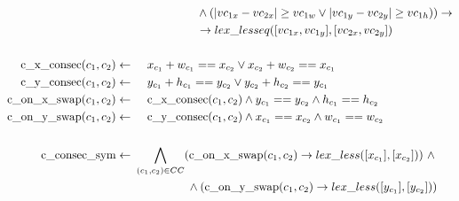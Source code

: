 \begin{align}
                                             & \hspace{2cm} \land (|vc_{1x} - vc_{2x}| \geq vc_{1w} \lor  |vc_{1y} - vc_{2y}| \geq vc_{1h}))  \rightarrow              \nonumber                                                                                           \\
                                             & \hspace{2cm} \rightarrow lex\_lesseq([vc_{1x}, vc_{1y}], [vc_{2x}, vc_{2y}])                                              \\
                                             & \nonumber                                                                                                                                                         \\
  \text{c\_x\_consec}(c_1, c_2)   \leftarrow & \hspace{0.5cm} x_{c_1} + w_{c_1} == x_{c_2} \lor x_{c_2} + w_{c_2} == x_{c_1}                                                                                     \\
  \text{c\_y\_consec}(c_1, c_2)   \leftarrow & \hspace{0.5cm} y_{c_1} + h_{c_1} == y_{c_2} \lor y_{c_2} + h_{c_2} == y_{c_1}                                                                                     \\
  \text{c\_on\_x\_swap}(c_1, c_2) \leftarrow & \hspace{0.5cm} \text{c\_x\_consec}(c_1, c_2) \land y_{c_1} == y_{c_2} \land h_{c_1} == h_{c_2}                                                                    \\
  \text{c\_on\_y\_swap}(c_1, c_2) \leftarrow & \hspace{0.5cm} \text{c\_y\_consec}(c_1, c_2) \land x_{c_1} == x_{c_2} \land w_{c_1} == w_{c_2}                                                                    \\
                                             & \nonumber                                                                                                                                                         \\
  \text{c\_consec\_sym}           \leftarrow & \ \bigwedge_{(c_1, c_2) \in CC} (\text{c\_on\_x\_swap}(c_1, c_2) \rightarrow lex\_less([ x_{c_1} ], [ x_{c_2} ]))\ \land                                \nonumber \\
                                             & \ \hspace{1.6cm} \land (\text{c\_on\_y\_swap}(c_1, c_2) \rightarrow lex\_less([ y_{c_1} ], [ y_{c_2} ]))
\end{align}

